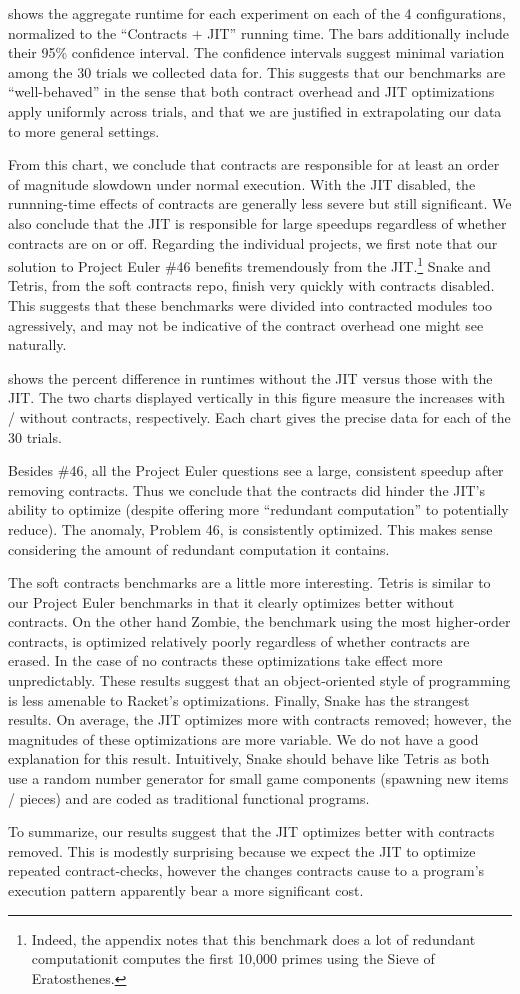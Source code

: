 

 shows the aggregate runtime for each experiment on each of the 4 configurations, normalized to the ``Contracts + JIT'' running time.
The bars additionally include their 95\% confidence interval.
The confidence intervals suggest minimal variation among the 30 trials we collected data for.
This suggests that our benchmarks are ``well-behaved'' in the sense that both contract overhead and JIT optimizations apply uniformly across trials, and that we are justified in extrapolating our data to more general settings.

From this chart, we conclude that contracts are responsible for at least an order of magnitude slowdown under normal execution.
With the JIT disabled, the runnning-time effects of contracts are generally less severe but still significant.
We also conclude that the JIT is responsible for large speedups regardless of whether contracts are on or off.
Regarding the individual projects, we first note that our solution to Project Euler \#46 benefits tremendously from the JIT.\footnote{Indeed, the appendix notes that this benchmark does a lot of redundant computation\textemdash it computes the first 10,000 primes using the Sieve of Eratosthenes.}
Snake and Tetris, from the soft contracts repo, finish very quickly with contracts disabled.
This suggests that these benchmarks were divided into contracted modules too agressively, and may not be indicative of the contract overhead one might see naturally.

\newpage


 shows the percent difference in runtimes without the JIT versus those with the JIT.
The two charts displayed vertically in this figure measure the increases with / without contracts, respectively.
Each chart gives the precise data for each of the 30 trials.

Besides \#46, all the Project Euler questions see a large, consistent speedup after removing contracts.
Thus we conclude that the contracts did hinder the JIT's ability to optimize (despite offering more ``redundant computation'' to potentially reduce).
The anomaly, Problem 46, is consistently optimized.
This makes sense considering the amount of redundant computation it contains.

The soft contracts benchmarks are a little more interesting.
Tetris is similar to our Project Euler benchmarks in that it clearly optimizes better without contracts.
On the other hand Zombie, the benchmark using the most higher-order contracts, is optimized relatively poorly regardless of whether contracts are erased.
In the case of no contracts these optimizations take effect more unpredictably.
These results suggest that an object-oriented style of programming is less amenable to Racket's optimizations.
Finally, Snake has the strangest results.
On average, the JIT optimizes more with contracts removed; however, the magnitudes of these optimizations are more variable.
We do not have a good explanation for this result.
Intuitively, Snake should behave like Tetris as both use a random number generator for small game components (spawning new items / pieces) and are coded as traditional functional programs.

To summarize, our results suggest that the JIT optimizes better with contracts removed.
This is modestly surprising because we expect the JIT to optimize repeated contract-checks, however the changes contracts cause to a program's execution pattern apparently bear a more significant cost.

